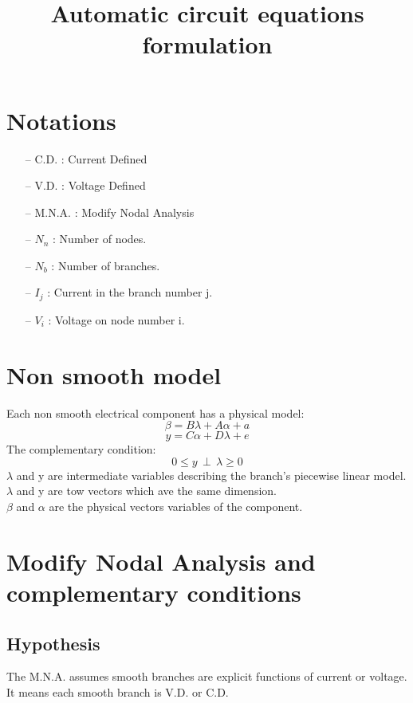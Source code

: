 \documentclass[10pt]{article}
\begin{document}
 \title{Automatic circuit equations formulation}

\maketitle

\newpage
\tableofcontents
 \newpage
 \section{Notations}
\begin{itemize}
\item[--] C.D. : Current Defined
\item[--] V.D. : Voltage Defined
\item[--] M.N.A. : Modify Nodal Analysis
\end{itemize}
 \begin{itemize}
\item[--] $N_{n}$ : Number of nodes.
\item[--] $N_{b}$ : Number of branches.
\item[--] $I_{j}$ : Current in the branch number j.
\item[--] $V_{i}$ : Voltage on node number i. 
\end{itemize}

 \section{Non smooth model}
Each non smooth electrical component has a physical model:
\[\beta=B\lambda + A\alpha +a\]
\[y=C\alpha + D\lambda +e\]
The complementary condition:
\[0 \leq y \, \perp \, \lambda \geq 0\]
$\lambda$ and y are intermediate variables describing the branch's piecewise linear model.
$\lambda$ and y are tow vectors which ave the same dimension.\\
\newline
$\beta$ and $\alpha$ are the physical vectors variables of the component.\\
\newpage
\section{Modify Nodal Analysis and complementary conditions}
\subsection{Hypothesis\\}
The M.N.A. assumes smooth branches are explicit functions of current or voltage. It means each smooth
branch is V.D. or C.D.\\
\end{document}
